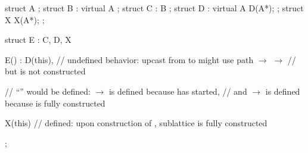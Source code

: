 \begin{example}
\begin{codeblock}
struct A { };
struct B : virtual A { };
struct C : B { };
struct D : virtual A { D(A*); };
struct X { X(A*); };

struct E : C, D, X {
  E() : D(this),    // undefined behavior: upcast from  to  might use path  $\rightarrow$  $\rightarrow$ 
                    // but  is not constructed

                    // ``\!'' would be defined:  $\rightarrow$  is defined because  has started,
                    // and  $\rightarrow$  is defined because  is fully constructed

  X(this) {}        // defined: upon construction of ,  sublattice is fully constructed
};
\end{codeblock}
\end{example}


